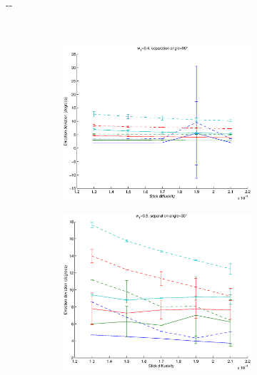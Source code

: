 \documentclass{article}
\begin{document}
\begin{figure}[H]
\begin{adjustwidth}{-\oddsidemargin}{-\rightmargin}
\begin{subfigure}{0.8\paperwidth}
      ~
      \begin{subfigure}{0.3\textwidth}
        \centering
        \includegraphics[width=\textwidth]{figures/synth_modbas_weights__snr=20__w1=4__angle=90.eps}
      \end{subfigure}
    \end{subfigure}
    \begin{subfigure}{0.8\paperwidth}
      \begin{subfigure}{0.3\textwidth}
        \centering
        \includegraphics[width=\textwidth]{figures/synth_modbas_weights__snr=20__w1=5__angle=30.eps}

\end{subfigure}
\end{subfigure}
\end{adjustwidth}
\end{figure}
\end{document}
